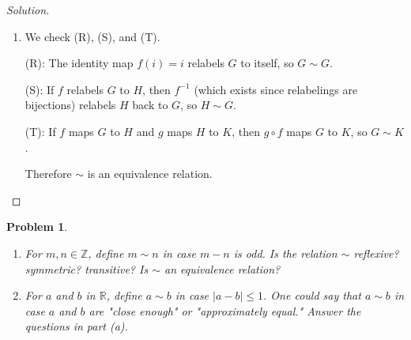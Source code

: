 \documentclass[12pt]{article}
\newtheorem{problem}{Problem}
\newcommand{\RR}{\ensuremath{\mathbb R}}
\newcommand{\ZZ}{\ensuremath{\mathbb Z}}
\begin{document}
\begin{proof}[Solution]
\begin{enumerate}[label=(\alph*)]
\begin{center}
    \end{center}

    Vertex 1 is isolated with only a loop (degree 1), and vertices 2 and 3 are joined by two parallel edges (each with degree 2). This differs from Figure 3 and part (b) since the looped vertex has degree 1 here, not 3.

    \item We check (R), (S), and (T).

    (R): The identity map $f(i) = i$ relabels $G$ to itself, so $G \sim G$.

    (S): If $f$ relabels $G$ to $H$, then $f^{-1}$ (which exists since relabelings are bijections) relabels $H$ back to $G$, so $H \sim G$.

    (T): If $f$ maps $G$ to $H$ and $g$ maps $H$ to $K$, then $g \circ f$ maps $G$ to $K$, so $G \sim K$.

    Therefore $\sim$ is an equivalence relation.
\end{enumerate}
\end{proof}

\setcounter{problem}{7}
\begin{problem}
\begin{enumerate}[label=(\alph*)]
    \item For $m, n \in \ZZ$, define $m \sim n$ in case $m - n$ is odd. Is the relation $\sim$ reflexive? symmetric? transitive? Is $\sim$ an equivalence relation?

    \item For $a$ and $b$ in $\RR$, define $a \sim b$ in case $|a - b| \leq 1$. One could say that $a \sim b$ in case $a$ and $b$ are "close enough" or "approximately equal." Answer the questions in part (a).
\end{enumerate}
\end{problem}
\end{document}
